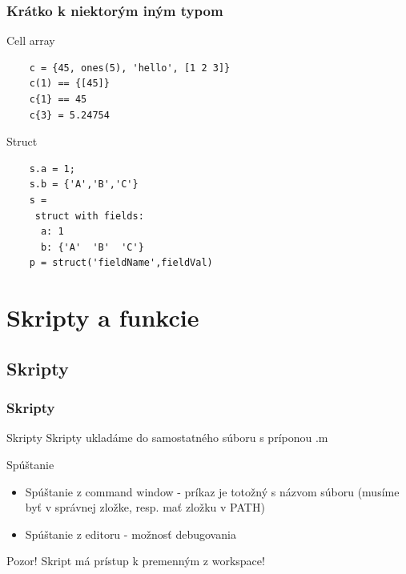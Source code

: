 \documentclass{beamer}
\begin{document}
\begin{frame}[fragile]
\frametitle{Krátko k niektorým iným typom}   
  
  \begin{block}{Cell array}
    \begin{verbatim}
    c = {45, ones(5), 'hello', [1 2 3]}
    c(1) == {[45]}
    c{1} == 45
    c{3} = 5.24754 \end{verbatim}    
  \end{block}  
  
  \pause
  
  \begin{block}{Struct}
    \begin{verbatim}
    s.a = 1;
    s.b = {'A','B','C'}
    s = 
     struct with fields:
      a: 1
      b: {'A'  'B'  'C'}
    p = struct('fieldName',fieldVal) \end{verbatim}
  \end{block}  
\end{frame}

\section{Skripty a funkcie}

\subsection{Skripty}

\begin{frame}
\frametitle{Skripty}
  \begin{block}{Skripty}
    Skripty ukladáme do samostatného súboru s príponou .m 
  \end{block}
  
  \begin{block}{Spúštanie}
  \begin{itemize}
      \item Spúštanie z command window - príkaz je totožný s názvom súboru (musíme byť v správnej zložke, resp. mať zložku v PATH)
      \item Spúštanie z editoru - možnosť debugovania
  \end{itemize}
  \end{block}
  
  \pause
  
  \begin{alertblock}{Pozor!}
    Skript má prístup k premenným z workspace!
  \end{alertblock}  
\end{frame}
    
\end{document}
